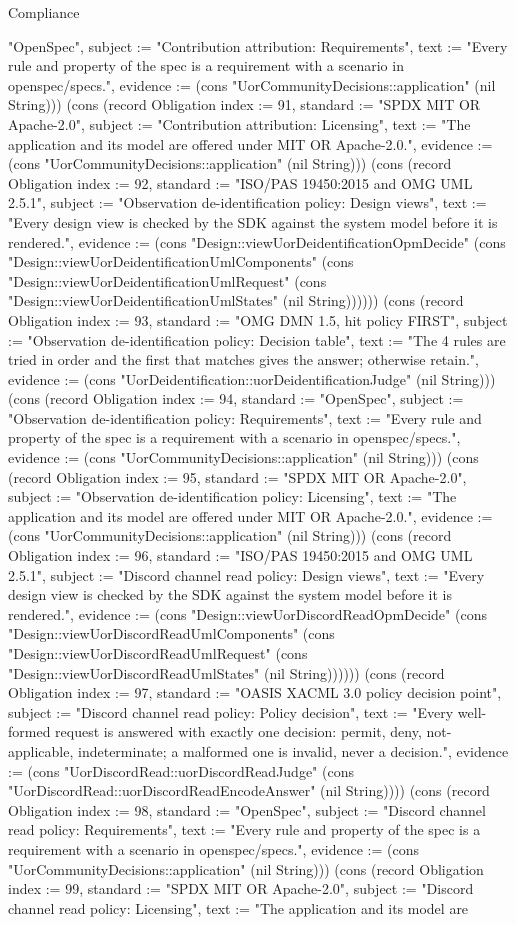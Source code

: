 \begin{lexlean}{Compliance}
\begin{semanticmodule}
{"OpenSpec", subject := "Contribution attribution: Requirements", text := "Every rule and property of the spec is a requirement with a scenario in openspec/specs.", evidence := (cons "UorCommunityDecisions::application" (nil String))}) (cons (record Obligation {index := 91, standard := "SPDX MIT OR Apache-2.0", subject := "Contribution attribution: Licensing", text := "The application and its model are offered under MIT OR Apache-2.0.", evidence := (cons "UorCommunityDecisions::application" (nil String))}) (cons (record Obligation {index := 92, standard := "ISO/PAS 19450:2015 and OMG UML 2.5.1", subject := "Observation de-identification policy: Design views", text := "Every design view is checked by the SDK against the system model before it is rendered.", evidence := (cons "Design::viewUorDeidentificationOpmDecide" (cons "Design::viewUorDeidentificationUmlComponents" (cons "Design::viewUorDeidentificationUmlRequest" (cons "Design::viewUorDeidentificationUmlStates" (nil String)))))}) (cons (record Obligation {index := 93, standard := "OMG DMN 1.5, hit policy FIRST", subject := "Observation de-identification policy: Decision table", text := "The 4 rules are tried in order and the first that matches gives the answer; otherwise retain.", evidence := (cons "UorDeidentification::uorDeidentificationJudge" (nil String))}) (cons (record Obligation {index := 94, standard := "OpenSpec", subject := "Observation de-identification policy: Requirements", text := "Every rule and property of the spec is a requirement with a scenario in openspec/specs.", evidence := (cons "UorCommunityDecisions::application" (nil String))}) (cons (record Obligation {index := 95, standard := "SPDX MIT OR Apache-2.0", subject := "Observation de-identification policy: Licensing", text := "The application and its model are offered under MIT OR Apache-2.0.", evidence := (cons "UorCommunityDecisions::application" (nil String))}) (cons (record Obligation {index := 96, standard := "ISO/PAS 19450:2015 and OMG UML 2.5.1", subject := "Discord channel read policy: Design views", text := "Every design view is checked by the SDK against the system model before it is rendered.", evidence := (cons "Design::viewUorDiscordReadOpmDecide" (cons "Design::viewUorDiscordReadUmlComponents" (cons "Design::viewUorDiscordReadUmlRequest" (cons "Design::viewUorDiscordReadUmlStates" (nil String)))))}) (cons (record Obligation {index := 97, standard := "OASIS XACML 3.0 policy decision point", subject := "Discord channel read policy: Policy decision", text := "Every well-formed request is answered with exactly one decision: permit, deny, not-applicable, indeterminate; a malformed one is invalid, never a decision.", evidence := (cons "UorDiscordRead::uorDiscordReadJudge" (cons "UorDiscordRead::uorDiscordReadEncodeAnswer" (nil String)))}) (cons (record Obligation {index := 98, standard := "OpenSpec", subject := "Discord channel read policy: Requirements", text := "Every rule and property of the spec is a requirement with a scenario in openspec/specs.", evidence := (cons "UorCommunityDecisions::application" (nil String))}) (cons (record Obligation {index := 99, standard := "SPDX MIT OR Apache-2.0", subject := "Discord channel read policy: Licensing", text := "The application and its model are }
\end{semanticmodule}
\end{lexlean}
